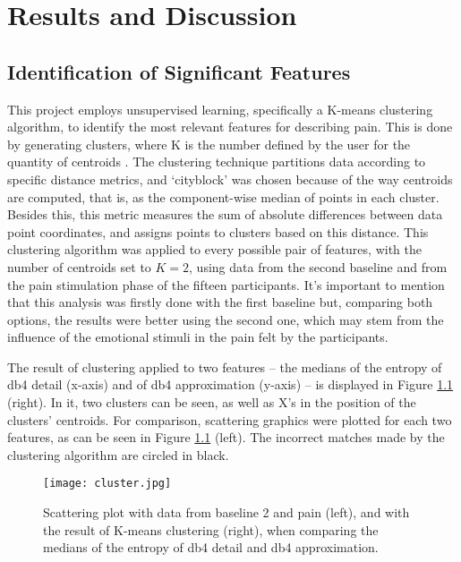 \chapter{Results and Discussion}

\section{Identification of Significant Features}

This project employs unsupervised learning, specifically a K-means clustering algorithm, to identify the most relevant features for describing pain. This is done by generating clusters, where K is the number defined by the user for the quantity of centroids \cite{Ikotun2023}. The clustering technique partitions data according to specific distance metrics, and `cityblock' was chosen because of the way centroids are computed, that is, as the component-wise median of points in each cluster. Besides this, this metric measures the sum of absolute differences between data point coordinates, and assigns points to clusters based on this distance. This clustering algorithm was applied to every possible pair of features, with the number of centroids set to $K=2$, using data from the second baseline and from the pain stimulation phase of the fifteen participants. It's important to mention that this analysis was firstly done with the first baseline but, comparing both options, the results were better using the second one, which may stem from the influence of the emotional stimuli in the pain felt by the participants.

The result of clustering applied to two features -- the medians of the entropy of db4 detail (x-axis) and of db4 approximation (y-axis) -- is displayed in Figure \ref{fig:cluster} (right). In it, two clusters can be seen, as well as X's in the position of the clusters' centroids.
For comparison, scattering graphics were plotted for each two features, as can be seen in Figure \ref{fig:cluster} (left). The incorrect matches made by the clustering algorithm are circled in black.

\begin{figure}[h!]
    \centering
    \texttt{[image: cluster.jpg]}
    \caption{Scattering plot with data from baseline 2 and pain (left), and with the result of K-means clustering (right), when comparing the medians of the entropy of db4 detail and db4 approximation.}
    \label{fig:cluster}
\end{figure}


